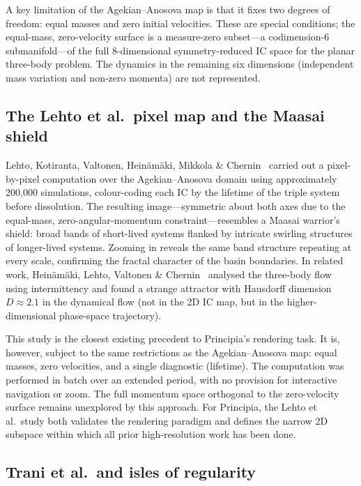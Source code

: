 \documentclass[11pt,a4paper]{article}
\begin{document}
A key limitation of the Agekian--Anosova map is that it fixes two degrees of freedom: equal
masses and zero initial velocities.  These are special conditions; the equal-mass, zero-velocity
surface is a measure-zero subset---a codimension-6 submanifold---of the full 8-dimensional
symmetry-reduced IC space for the planar three-body problem.  The dynamics in the remaining six
dimensions (independent mass variation and non-zero momenta) are not represented.

\subsection{The Lehto et al.\ pixel map and the Maasai shield}

Lehto, Kotiranta, Valtonen, Heinäm\"{a}ki, Mikkola \& Chernin~\cite{lehto2008} carried out a
pixel-by-pixel computation over the Agekian--Anosova domain using approximately 200,000
simulations, colour-coding each IC by the lifetime of the triple system before dissolution.
The resulting image---symmetric about both axes due to the equal-mass, zero-angular-momentum
constraint---resembles a Maasai warrior's shield: broad bands of short-lived systems flanked by
intricate swirling structures of longer-lived systems.  Zooming in reveals the same band
structure repeating at every scale, confirming the fractal character of the basin boundaries.
In related work, Heinäm\"{a}ki, Lehto, Valtonen \& Chernin~\cite{heinamaki1998} analysed the
three-body flow using intermittency and found a strange attractor with Hausdorff dimension
$D \approx 2.1$ in the dynamical flow (not in the 2D IC map, but in the higher-dimensional
phase-space trajectory).

This study is the closest existing precedent to Principia's rendering task.  It is, however,
subject to the same restrictions as the Agekian--Anosova map: equal masses, zero velocities,
and a single diagnostic (lifetime).  The computation was performed in batch over an extended
period, with no provision for interactive navigation or zoom.  The full momentum space
orthogonal to the zero-velocity surface remains unexplored by this approach.  For Principia,
the Lehto et al.\ study both validates the rendering paradigm and defines the narrow 2D subspace
within which all prior high-resolution work has been done.

\subsection{Trani et al.\ and isles of regularity}
\end{document}
